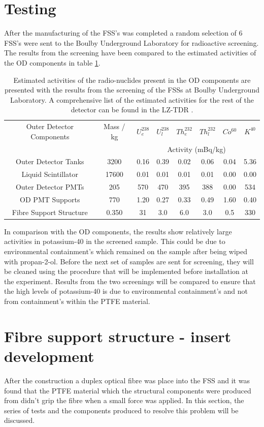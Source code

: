 \section{Testing}
After the manufacturing of the FSS's was completed a random selection of 6 FSS's were sent to the Boulby Underground Laboratory for radioactive screening. The results from the screening have been compared to the estimated activities of the OD components in table \ref{table:radio-nuc}.  
\begin{table}[h!]
\centering
\begin{tabular}{|c|c|c|c|c|c|c|c|} 
    \hline
    Outer Detector Components & Mass / kg & $U_e^{238}$ & $U_l^{238}$ & $Th_e^{232}$ & $Th_l^{232}$ & $Co^{60}$ & $K^{40}$ \\
    & & \multicolumn{6}{c|}{Activity (mBq/kg)} \\
    \hline
    Outer Detector Tanks & 3200 & 0.16 & 0.39 & 0.02 & 0.06 & 0.04 & 5.36 \\
    \hline
    Liquid Scintillator & 17600 & 0.01 & 0.01 & 0.01 & 0.01 & 0.00 & 0.00 \\
    \hline
    Outer Detector PMTs & 205 & 570 & 470 & 395 & 388 & 0.00 & 534 \\
    \hline
    OD PMT Supports & 770 & 1.20 & 0.27 & 0.33 & 0.49 & 1.60 & 0.40 \\
    \hline
    Fibre Support Structure & 0.350 & 31 & 3.0 & 6.0 & 3.0 & 0.5 & 330 \\
    \hline
\end{tabular}
\caption{Estimated activities of the radio-nuclides present in the OD components are presented with the results from the screening of the FSSs at Boulby Underground Laboratory. A comprehensive list of the estimated activities for the rest of the detector can be found in the LZ-TDR \cite{LZTDR}.}
\label{table:radio-nuc}
\end{table}
In comparison with the OD components, the results show relatively large activities in potassium-40 in the screened sample. This could be due to environmental containment's which remained on the sample after being wiped with propan-2-ol. Before the next set of samples are sent for screening, they will be cleaned using the procedure that will be implemented before installation at the experiment. Results from the two screenings will be compared to ensure that the high levels of potassium-40 is due to environmental containment's and not from containment's within the PTFE material.

\section{Fibre support structure - insert development}\label{sec:FSSID}
After the construction a duplex optical fibre was place into the FSS and it was found that the PTFE material which the structural components were produced from didn't grip the fibre when a small force was applied. In this section, the series of tests and the components produced to resolve this problem will be discussed. 


